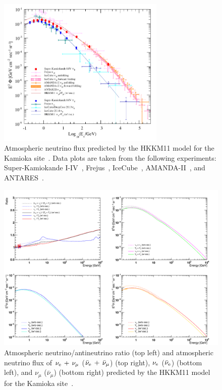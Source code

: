 \begin{figure}[p]
	\centering
	\includegraphics[width=8cm]{Figures/Simulation/AtmNeuFlux}
	\caption[Atmospheric neutrino flux predicted by the HKKM11 model for the Kamioka site]{
	Atmospheric neutrino flux predicted by the HKKM11 model for the Kamioka site~\cite{2011Honda,2016Richard}.
	Data plots are taken from the following experiments: Super-Kamiokande I-IV~\cite{2016Richard}, Frejus~\cite{1995Daum}, IceCube~\cite{2011Abbasi,2011Abbasi_02,2013Aartsen,2015Aartsen}, AMANDA-II~\cite{2009Abbasi,2010Abbasi}, and ANTARES~\cite{2013Adrian}.
	}\label{Simula_AtmNeuFlux}
\end{figure}

\begin{figure}[p]
	\centering
	\includegraphics[width=16cm]{Figures/Simulation/Ratio}
	\caption[Atmospheric neutrino/antineutrino ratio and atmospheric neutrino flux of $\nu_{\rm e}\,+\,\nu_{\mu}$ ($\bar{\nu}_{\rm e}\,+\,\bar{\nu}_{\mu}$), $\nu_{\rm e}$ ($\bar{\nu}_{\rm e}$), and $\nu_{\mu}$ ($\bar{\nu}_{\mu}$) predicted by the HKKM11 model for the Kamioka site]{
	Atmospheric neutrino/antineutrino ratio (top left) and atmospheric neutrino flux of $\nu_{\rm e}\,+\,\nu_{\mu}$ ($\bar{\nu}_{\rm e}\,+\,\bar{\nu}_{\mu}$) (top right), $\nu_{\rm e}$ ($\bar{\nu}_{\rm e}$) (bottom left), and $\nu_{\mu}$ ($\bar{\nu}_{\mu}$) (bottom right) predicted by the HKKM11 model for the Kamioka site~\cite{2011Honda}.
	}\label{Simula_Ratio}
\end{figure}





